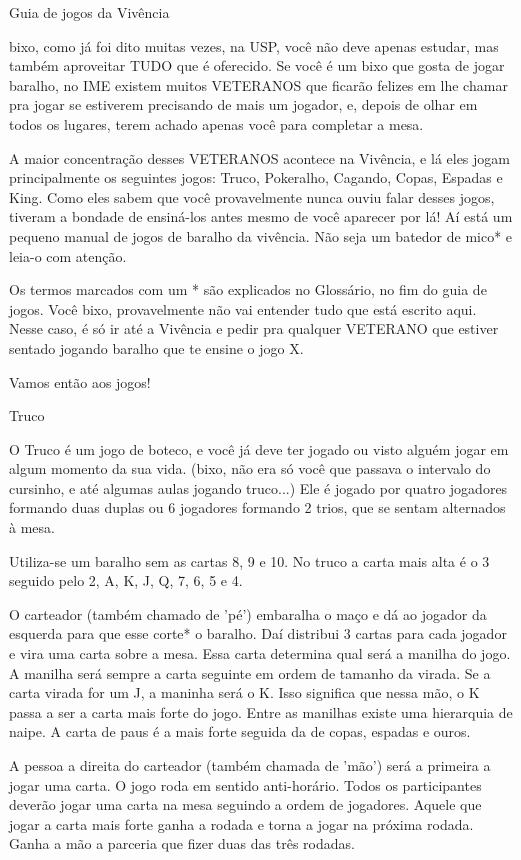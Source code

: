 \begin{secao}{Guia de jogos da Vivência }

bixo, como já foi dito muitas vezes, na USP, você não deve apenas estudar, mas também aproveitar TUDO que é oferecido. Se você é um bixo que gosta de jogar baralho, no IME existem muitos VETERANOS que ficarão felizes em lhe chamar pra jogar se estiverem precisando de mais um jogador, e, depois de olhar em todos os lugares, terem achado apenas você para completar a mesa. 

A maior concentração desses VETERANOS acontece na Vivência, e lá eles jogam principalmente os seguintes jogos: Truco, Pokeralho, Cagando, Copas, Espadas e King. Como eles sabem que você provavelmente nunca ouviu falar desses jogos, tiveram a bondade de ensiná-los antes mesmo de você aparecer por lá! Aí está um pequeno manual de jogos de baralho da vivência. Não seja um batedor de mico* e leia-o com atenção. 

Os termos marcados com um * são explicados no Glossário, no fim do guia de jogos. Você bixo, provavelmente não vai entender tudo que está escrito aqui. Nesse caso, é só ir até a Vivência e pedir pra qualquer VETERANO que estiver sentado jogando baralho que te ensine o jogo X.

Vamos então aos jogos!

\begin{subsecao}{Truco}

O Truco é um jogo de boteco, e você já deve ter jogado ou visto alguém jogar em algum momento da sua vida. (bixo, não era só você que passava o intervalo do cursinho, e até algumas aulas jogando truco...) Ele é jogado por quatro jogadores formando duas duplas ou 6 jogadores formando 2 trios, que se sentam alternados à mesa.

Utiliza-se um baralho sem as cartas 8, 9 e 10. No truco a carta mais alta é o 3 seguido pelo 2, A, K, J, Q, 7, 6, 5 e 4. 

O carteador (também chamado de 'pé') embaralha o maço e dá ao jogador da esquerda para que esse corte* o baralho. Daí distribui 3 cartas para cada jogador e vira uma carta sobre a mesa. Essa carta determina qual será a manilha do jogo. A manilha será sempre a carta seguinte em ordem de tamanho da virada. Se a carta virada for um J, a maninha será o K. Isso significa que nessa mão, o K passa a ser a carta mais forte do jogo. Entre as manilhas existe uma hierarquia de naipe. A carta de paus é a mais forte seguida da de copas, espadas e ouros.

A pessoa a direita do carteador (também chamada de 'mão') será a primeira a jogar uma carta. O jogo roda em sentido anti-horário. Todos os participantes deverão jogar uma carta na mesa seguindo a ordem de jogadores. Aquele que jogar a carta mais forte ganha a rodada e torna a jogar na próxima rodada. Ganha a mão a parceria que fizer duas das três rodadas.


\end{subsecao}
\end{secao}
